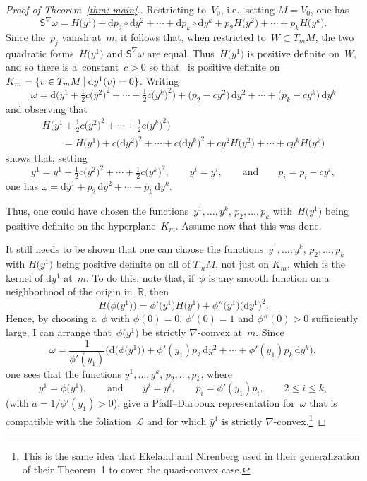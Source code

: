 \documentclass[pdftex]{sigma}
\renewcommand{\d}{\mathrm{d}}%
\newcommand{\cL}{{\mathcal L}}
\newcommand{\bbR}{{\mathbb R}}
\newcommand{\Ss}{\mathsf{S}}
\numberwithin{equation}{section}
\begin{document}
\begin{proof}[Proof of Theorem~\ref{thm: main}.]
Restricting to~$V_0$, i.e., setting $M=V_0$, one has
\[
\Ss^\nabla\omega = H\big(y^1\big) + \d p_2\circ \d y^2 + \cdots + \d p_k\circ \d y^k
 + p_2 H\big(y^2\big) + \cdots + p_k H\big(y^k\big).
\]
Since the~$p_j$ vanish at~$m$,
it follows that, when restricted to~$W\subset T_mM$,
the two quadratic forms~$H\big(y^1\big)$ and $\Ss^\nabla\omega$ are equal.
Thus~$H\big(y^1\big)$ is positive definite on~$W$,
and so there is a~constant~$c>0$
so that~\smash{$H\big(y^1\big) + c \big(\d y^2\big)^2 + \cdots + c \big(\d y^k\big)^2$}
is positive definite on~$K_m = \{v\in T_mM\ \vrule\ \d y^1(v) = 0\}$.
Writing
\[
\omega = \d\bigl(y^1 + \tfrac12c \big(y^2\big)^2 + \cdots + \tfrac12c \big(y^k\big)^2\bigr)
 + \big(p_2-c y^2\big)\,\d y^2 + \cdots + \big(p_k-c y^k\big)\,\d y^k
\]
and observing that
\begin{gather*}
H\big(y^1 + \tfrac12c \big(y^2\big)^2 + \cdots + \tfrac12c \big(y^k\big)^2\big)\\
\qquad = H\big(y^1\big) + c \big(\d y^2\big)^2 + \cdots + c \big(\d y^k\big)^2
 + c y^2 H\big(y^2\big) + \cdots + c y^k H\big(y^k\big)
\end{gather*}
shows that, setting
\[
\bar y^1 = y^1 + \tfrac12c \big(y^2\big)^2 + \cdots + \tfrac12c \big(y^k\big)^2,
\qquad
\bar y^i = y^i,
\qquad\text{and}\qquad
\bar p_i = p_i - c y^i,
\]
one has
$\omega = \d\bar y^1
 + \bar p_2\,\d \bar y^2 + \cdots + \bar p_k\,\d \bar y^k$.

Thus, one could have chosen the functions~$y^1,\ldots,y^k$, $p_2,\ldots,p_k$
with~$H\big(y^1\big)$ being positive definite on the hyperplane~$K_m$.
Assume now that this was done.

It still needs to be shown that one can choose
the functions~$y^1,\ldots,y^k$, $p_2,\ldots,p_k$
with $H\big(y^1\big)$ being positive definite on all of $T_mM$,
not just on $K_m$, which is the kernel of $\d y^1$ at~$m$.
To do this, note that, if~$\phi$ is any smooth function on a neighborhood
of the origin in~$\bbR$, then
\[
H\bigl(\phi\big(y^1\big)\bigr) = \phi'\big(y^1\big) H\big(y^1\big) + \phi''\big(y^1\big) \big(\d y^1\big)^2.
\]
Hence, by choosing a~$\phi$ with $\phi(0)=0$, $\phi'(0)=1$
and $\phi''(0)>0$ sufficiently large,
I can arrange that~$\phi\big(y^1\big)$ be strictly $\nabla$-convex at~$m$.
Since
\[
\omega = \frac{1}{\phi'(y_1)} \big(\d\bigl(\phi\big(y^1\big)\bigr)
    + \phi'(y_1)p_2\,\d y^2 +\cdots + \phi'(y_1)p_k\,\d y^k\big),
\]
one sees that the functions
$\bar y^1,\ldots,\bar y^k$, $\bar p_2,\ldots,\bar p_k$, where
\[
\bar y^1 = \phi\big(y^1\big),
\qquad\text{and}\qquad
\bar y^i = y^i,
\qquad
\bar p_i = \phi'(y_1)p_i,\qquad 2\le i\le k,
\]
(with $a = 1/\phi'(y_1) >0$), give a Pfaff--Darboux representation
for~$\omega$ that is compatible with the foliation~$\cL$ and
for which $\bar y^1$ is strictly $\nabla$-convex.\footnote{This is the same idea that Ekeland and Nirenberg \cite{MR2023129}
used in their generalization of their Theorem~1
to cover the quasi-convex case.}


\end{proof}
\end{document}
